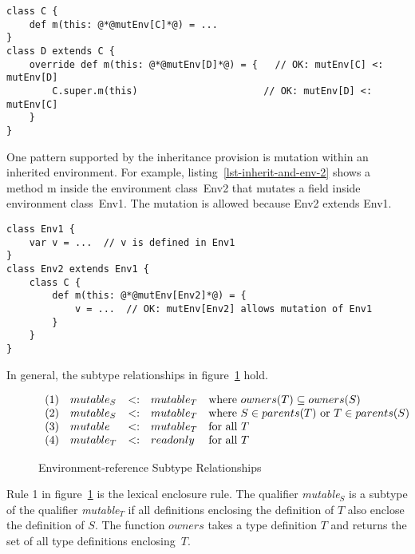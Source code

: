 \begin{lstlisting}[caption={Inheritance and Environment References},float={htpb},label={lst-inherit-and-env}]
class C {
	def m(this: @*@mutEnv[C]*@) = ...
}
class D extends C {
	override def m(this: @*@mutEnv[D]*@) = {   // OK: mutEnv[C] <: mutEnv[D]
		C.super.m(this)                      // OK: mutEnv[D] <: mutEnv[C]
	}
}
\end{lstlisting}

One pattern supported by the inheritance provision
is mutation within an inherited environment.
For example, listing~\ref{lst-inherit-and-env-2} shows a method {\cd m}
inside the environment class~{\cd Env2} that mutates a field
inside environment class~{\cd Env1}.
The mutation is allowed because {\cd Env2} extends {\cd Env1}.

\begin{lstlisting}[caption={Inheritance and Environment References (2)},float={htp},label={lst-inherit-and-env-2}]
class Env1 {
	var v = ...  // v is defined in Env1
}
class Env2 extends Env1 {
	class C {
		def m(this: @*@mutEnv[Env2]*@) = {
			v = ...  // OK: mutEnv[Env2] allows mutation of Env1
		}
	}
}
\end{lstlisting}


In general, the subtype relationships in figure~\ref{envqual-subtype} hold.
\begin{figure}[htpb]
\begin{equation*} %
\begin{array}{l c l l}
	(1)\quad mutable_S &<:& mutable_T & \text{where}\ owners(T) \subseteq owners(S) \\
	(2)\quad mutable_S &<:& mutable_T & \text{where}\ S \in parents(T)\ \text{or}\ T \in parents(S) \\
	(3)\quad mutable   &<:& mutable_T & \text{for all}\ T \\
	(4)\quad mutable_T &<:& readonly  & \text{for all}\ T \\
\end{array}
\end{equation*}
\caption{Environment-reference Subtype Relationships}
\label{envqual-subtype}
\end{figure}

Rule 1 in figure~\ref{envqual-subtype} is the lexical enclosure rule.
The qualifier \mbox{{\em mutable}$_S$} is a subtype of the qualifier \mbox{{\em mutable}$_T$}
if all definitions enclosing the definition of $T$ also enclose the definition of $S$.
The function \mbox{$owners$} takes a type definition $T$ and returns the set of all
type definitions enclosing~$T$.

